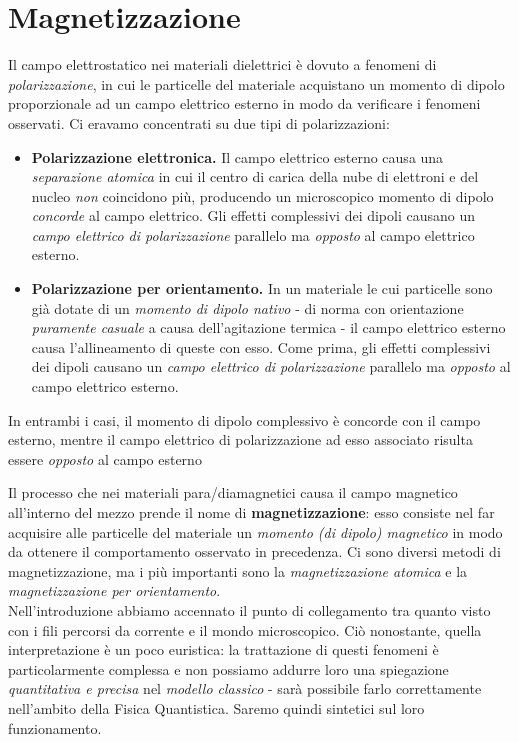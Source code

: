 \section{Magnetizzazione}
\begin{remember}
	Il campo elettrostatico nei materiali dielettrici è dovuto a fenomeni di \textit{polarizzazione}, in cui le particelle del materiale acquistano un momento di dipolo proporzionale ad un campo elettrico esterno in modo da verificare i fenomeni osservati. Ci eravamo concentrati su due tipi di polarizzazioni:
	\begin{itemize}
		\item \textbf{Polarizzazione elettronica.} Il campo elettrico esterno causa una \textit{separazione atomica} in cui il centro di carica della nube di elettroni e del nucleo \textit{non} coincidono più, producendo un microscopico momento di dipolo \textit{concorde} al campo elettrico. Gli effetti complessivi dei dipoli causano un \textit{campo elettrico di polarizzazione} parallelo ma \textit{opposto} al campo elettrico esterno.
		\item \textbf{Polarizzazione per orientamento.} In un materiale le cui particelle sono già dotate di un \textit{momento di dipolo nativo} - di norma con orientazione \textit{puramente casuale} a causa dell'agitazione termica - il campo elettrico esterno causa l'allineamento di queste con esso. Come prima, gli effetti complessivi dei dipoli causano un \textit{campo elettrico di polarizzazione} parallelo ma \textit{opposto} al campo elettrico esterno.
	\end{itemize}
In entrambi i casi, il momento di dipolo complessivo è concorde con il campo esterno, mentre il campo elettrico di polarizzazione ad esso associato risulta essere \textit{opposto} al campo esterno
\end{remember}
Il processo che nei materiali para/diamagnetici causa il campo magnetico all'interno del mezzo prende il nome di \textbf{magnetizzazione}: esso consiste nel far acquisire alle particelle del materiale un \textit{momento (di dipolo) magnetico} in modo da ottenere il comportamento osservato in precedenza. Ci sono diversi metodi di magnetizzazione, ma i più importanti sono la \textit{magnetizzazione atomica} e la \textit{magnetizzazione per orientamento}.\\
Nell'introduzione abbiamo accennato il punto di collegamento tra quanto visto con i fili percorsi da corrente e il mondo microscopico. Ciò nonostante, quella interpretazione è un poco euristica: la trattazione di questi fenomeni è particolarmente complessa e non possiamo addurre loro una spiegazione \textit{quantitativa e precisa} nel \textit{modello classico} - sarà possibile farlo correttamente nell'ambito della Fisica Quantistica. Saremo quindi sintetici sul loro funzionamento.
